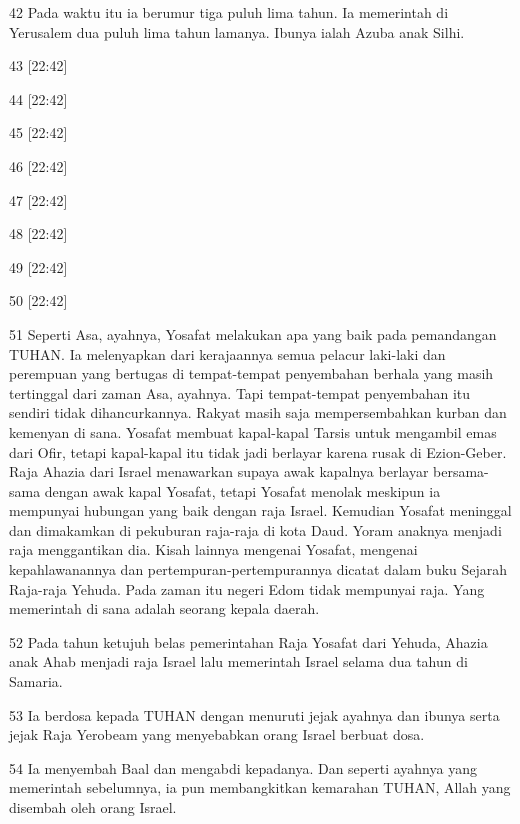 \par 42 Pada waktu itu ia berumur tiga puluh lima tahun. Ia memerintah di Yerusalem dua puluh lima tahun lamanya. Ibunya ialah Azuba anak Silhi.
\par 43 [22:42]
\par 44 [22:42]
\par 45 [22:42]
\par 46 [22:42]
\par 47 [22:42]
\par 48 [22:42]
\par 49 [22:42]
\par 50 [22:42]
\par 51 Seperti Asa, ayahnya, Yosafat melakukan apa yang baik pada pemandangan TUHAN. Ia melenyapkan dari kerajaannya semua pelacur laki-laki dan perempuan yang bertugas di tempat-tempat penyembahan berhala yang masih tertinggal dari zaman Asa, ayahnya. Tapi tempat-tempat penyembahan itu sendiri tidak dihancurkannya. Rakyat masih saja mempersembahkan kurban dan kemenyan di sana. Yosafat membuat kapal-kapal Tarsis untuk mengambil emas dari Ofir, tetapi kapal-kapal itu tidak jadi berlayar karena rusak di Ezion-Geber. Raja Ahazia dari Israel menawarkan supaya awak kapalnya berlayar bersama-sama dengan awak kapal Yosafat, tetapi Yosafat menolak meskipun ia mempunyai hubungan yang baik dengan raja Israel. Kemudian Yosafat meninggal dan dimakamkan di pekuburan raja-raja di kota Daud. Yoram anaknya menjadi raja menggantikan dia. Kisah lainnya mengenai Yosafat, mengenai kepahlawanannya dan pertempuran-pertempurannya dicatat dalam buku Sejarah Raja-raja Yehuda. Pada zaman itu negeri Edom tidak mempunyai raja. Yang memerintah di sana adalah seorang kepala daerah.
\par 52 Pada tahun ketujuh belas pemerintahan Raja Yosafat dari Yehuda, Ahazia anak Ahab menjadi raja Israel lalu memerintah Israel selama dua tahun di Samaria.
\par 53 Ia berdosa kepada TUHAN dengan menuruti jejak ayahnya dan ibunya serta jejak Raja Yerobeam yang menyebabkan orang Israel berbuat dosa.
\par 54 Ia menyembah Baal dan mengabdi kepadanya. Dan seperti ayahnya yang memerintah sebelumnya, ia pun membangkitkan kemarahan TUHAN, Allah yang disembah oleh orang Israel.


